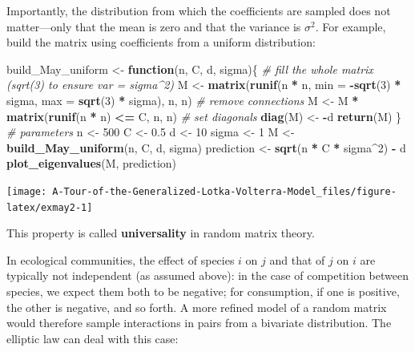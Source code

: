 \documentclass[
]{book}
\newenvironment{Shaded}{\begin{snugshade}}{\end{snugshade}}
\newcommand{\CommentTok}[1]{\textcolor[rgb]{0.56,0.35,0.01}{\textit{#1}}}
\newcommand{\ControlFlowTok}[1]{\textcolor[rgb]{0.13,0.29,0.53}{\textbf{#1}}}
\newcommand{\DataTypeTok}[1]{\textcolor[rgb]{0.13,0.29,0.53}{#1}}
\newcommand{\DecValTok}[1]{\textcolor[rgb]{0.00,0.00,0.81}{#1}}
\newcommand{\FloatTok}[1]{\textcolor[rgb]{0.00,0.00,0.81}{#1}}
\newcommand{\KeywordTok}[1]{\textcolor[rgb]{0.13,0.29,0.53}{\textbf{#1}}}
\newcommand{\NormalTok}[1]{#1}
\newcommand{\OperatorTok}[1]{\textcolor[rgb]{0.81,0.36,0.00}{\textbf{#1}}}
\newcommand{\StringTok}[1]{\textcolor[rgb]{0.31,0.60,0.02}{#1}}
\begin{document}
Importantly, the distribution from which the coefficients are sampled does not matter---only that the mean is zero and that the variance is \(\sigma^2\). For example, build the matrix using coefficients from a uniform distribution:

\begin{Shaded}
\begin{Highlighting}[]
\NormalTok{build_May_uniform <-}\StringTok{ }\ControlFlowTok{function}\NormalTok{(n, C, d, sigma)\{}
  \CommentTok{# fill the whole matrix (sqrt(3) to ensure var = sigma^2)}
\NormalTok{  M <-}\StringTok{ }\KeywordTok{matrix}\NormalTok{(}\KeywordTok{runif}\NormalTok{(n }\OperatorTok{*}\StringTok{ }\NormalTok{n, }\DataTypeTok{min =} \OperatorTok{-}\KeywordTok{sqrt}\NormalTok{(}\DecValTok{3}\NormalTok{) }\OperatorTok{*}\StringTok{ }\NormalTok{sigma, }\DataTypeTok{max =} \KeywordTok{sqrt}\NormalTok{(}\DecValTok{3}\NormalTok{) }\OperatorTok{*}\StringTok{ }\NormalTok{sigma), n, n)}
  \CommentTok{# remove connections }
\NormalTok{  M <-}\StringTok{ }\NormalTok{M }\OperatorTok{*}\StringTok{ }\KeywordTok{matrix}\NormalTok{(}\KeywordTok{runif}\NormalTok{(n }\OperatorTok{*}\StringTok{ }\NormalTok{n) }\OperatorTok{<=}\StringTok{ }\NormalTok{C, n, n)}
  \CommentTok{# set diagonals}
  \KeywordTok{diag}\NormalTok{(M) <-}\StringTok{ }\OperatorTok{-}\NormalTok{d}
  \KeywordTok{return}\NormalTok{(M)}
\NormalTok{\}}
\CommentTok{# parameters}
\NormalTok{n <-}\StringTok{ }\DecValTok{500}
\NormalTok{C <-}\StringTok{ }\FloatTok{0.5}
\NormalTok{d <-}\StringTok{ }\DecValTok{10}
\NormalTok{sigma <-}\StringTok{ }\DecValTok{1}
\NormalTok{M <-}\StringTok{ }\KeywordTok{build_May_uniform}\NormalTok{(n, C, d, sigma)}
\NormalTok{prediction <-}\StringTok{ }\KeywordTok{sqrt}\NormalTok{(n }\OperatorTok{*}\StringTok{ }\NormalTok{C }\OperatorTok{*}\StringTok{ }\NormalTok{sigma}\OperatorTok{^}\DecValTok{2}\NormalTok{) }\OperatorTok{-}\StringTok{ }\NormalTok{d}
\KeywordTok{plot_eigenvalues}\NormalTok{(M, prediction)}
\end{Highlighting}
\end{Shaded}

\begin{center}\texttt{[image: A-Tour-of-the-Generalized-Lotka-Volterra-Model\_files/figure-latex/exmay2-1]} \end{center}

This property is called \textbf{universality} in random matrix theory.

In ecological communities, the effect of species \(i\) on \(j\) and that of \(j\) on \(i\) are typically not independent (as assumed above): in the case of competition between species, we expect them both to be negative; for consumption, if one is positive, the other is negative, and so forth. A more refined model of a random matrix would therefore sample interactions in pairs from a bivariate distribution. The elliptic law can deal with this case:
\end{document}
